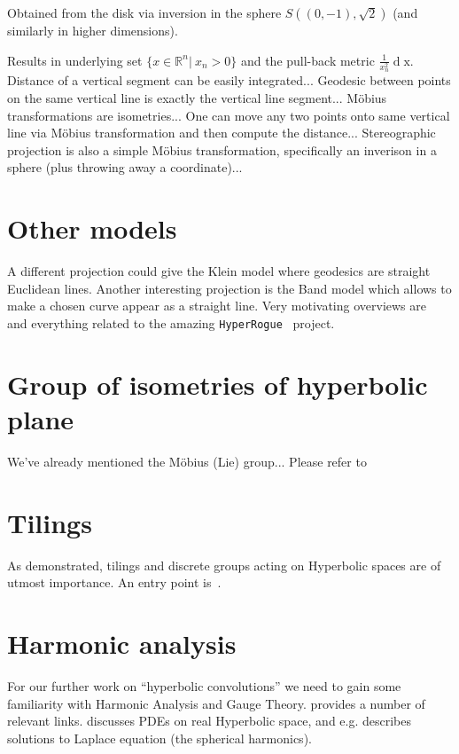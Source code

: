 Obtained from the disk via inversion in the sphere \( S((0, -1), \sqrt{2}) \)
(and similarly in higher dimensions).


Results in underlying set \( \{ x\in\mathbb{R}^n \left|~x_n > 0\right.\} \)
and the pull-back metric \( \frac{1}{x_n^2} \operatorname{d}\mathrm{x} \).
Distance of a vertical segment can be easily integrated...
Geodesic between points on the same vertical line is exactly the vertical line segment...
M\"obius transformations are isometries...
One can move any two points onto same vertical line via M\"obius transformation
and then compute the distance...
Stereographic projection is also a simple M\"obius transformation, specifically
an inverison in a sphere (plus throwing away a coordinate)...

\section{Other models}

A different projection could give the Klein model where geodesics are straight
Euclidean lines. Another interesting projection is the Band model which allows
to make a chosen curve appear as a straight line. Very motivating overviews
are~\citet{bulatovConformal} and everything related to the amazing
\texttt{HyperRogue}~\cite{hyperrogue} project.

\section*{Group of isometries of hyperbolic plane}

We've already mentioned the M\"obius (Lie) group...
Please refer to~\cite{beardonGeometryDiscrete,hubbardTeichmuller}

\section{Tilings}

As \citet{yaSaTilingBased} demonstrated, tilings and discrete groups acting on
Hyperbolic spaces are of utmost importance. An entry point is~\citet{gromov}.


\section{Harmonic analysis}

For our further work on ``hyperbolic convolutions'' we need to gain some
familiarity with Harmonic Analysis and Gauge Theory.
 provides a number of relevant links.
\citet{stollharmonic} discusses PDEs on real Hyperbolic space, and e.g.
describes solutions to Laplace equation (the spherical harmonics).

